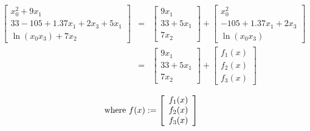 \documentclass[11pt]{article}
\renewcommand{\_}{{\char"5F}}
\renewcommand{\{}{{\char"7B}}
\renewcommand{\}}{{\char"7D}}
\renewcommand{\^}{{\char"0D}}
\renewcommand{\'}{{\char"0D}}
\begin{document}
\begin{eqnarray*}
    \left[ 
        \begin{array}{r}
            x_0^2+9x_1 \\ 
            33 - 105 + 1.37x_1 + 2x_3 + 5x_1 \\
            \ln (x_0x_3) + 7x_2
        \end{array}
    \right]
&=&
    \left[ 
        \begin{array}{r}
            9x_1 \\ 
            33 + 5x_1 \\
            7x_2
        \end{array}
    \right]
+
    \left[ 
        \begin{array}{r}
            x_0^2 \\ 
            - 105 + 1.37x_1 + 2x_3  \\
            \ln (x_0x_3)
        \end{array}
    \right] 
  \nonumber  \\
  &=&  \left[ 
        \begin{array}{r}
            9x_1 \\ 
            33 + 5x_1 \\
            7x_2
        \end{array}
    \right]
+
    \left[ 
        \begin{array}{r}
            f_1(x) \\ 
            f_2(x) \\
            f_3(x)
        \end{array}
    \right]
\end{eqnarray*}

\begin{eqnarray}
\hbox{\rm where}\ f(x) :=
%
    \left[ 
        \begin{array}{r}
            f_1(x) \\ 
            f_2(x) \\
            f_3(x)
        \end{array}   \label{eq:definef}
    \right]
\end{eqnarray}
\end{document}
